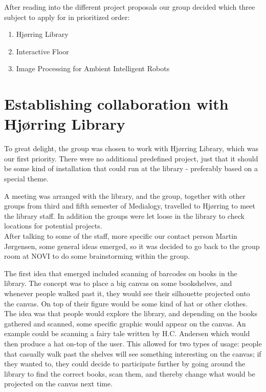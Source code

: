 After reading into the different project proposals our group decided which three subject to apply for in prioritized order:

\begin{enumerate} 
\item Hj{\o}rring Library 
\item Interactive Floor 
\item Image Processing for Ambient Intelligent Robots 
\end{enumerate}

\section{Establishing collaboration with Hj{\o}rring Library}

To great delight, the group was chosen to work with Hj{\o}rring Library, which was our first priority. There were no additional predefined project, just that it should be some kind of installation that could run at the library - preferably based on a special theme.

A meeting was arranged with the library, and the group, together with other groups from third and fifth semester of Medialogy, travelled to Hj{\o}rring to meet the library staff. In addition the groups were let loose in the library to check locations for potential projects.\\
After talking to some of the staff, more specific our contact person Martin J{\o}rgensen, some general ideas emerged, so it was decided to go back to the group room at NOVI to do some brainstorming within the group.

The first idea that emerged included scanning of barcodes on books in the library. The concept was to place a big canvas on some bookshelves, and whenever people walked past it, they would see their silhouette projected onto the canvas. On top of their figure would be some kind of hat or other clothes. The  idea was that people would explore the library, and depending on the books gathered and scanned, some specific graphic would appear on the canvas. An example could be scanning a fairy tale written by H.C. Andersen which would then produce a hat on-top of the user. This allowed for two types of usage: people that casually walk past the shelves will see something interesting on the canvas; if they wanted to, they could decide to participate further by going around the library to find the correct books, scan them, and thereby change what would be projected on the canvas next time.

